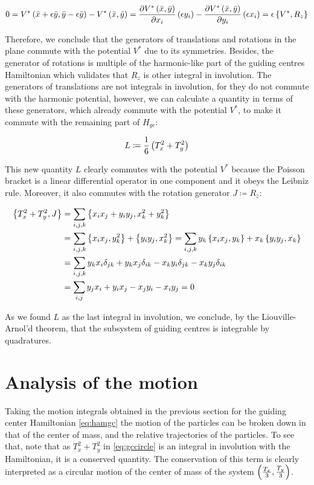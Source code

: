 \begin{equation*}
0={V^*\left( \bar{x} +\epsilon \bar{y}, \bar{y} - \epsilon \bar{y} \right)-V^*\left( \bar{x},\bar{y} \right)}
= \frac{\partial V^*\left( \bar{x},\bar{y} \right)}{\partial x_i} \left( \epsilon y_i \right) -                                \frac{\partial V^*\left( \bar{x},\bar{y} \right)}{\partial y_i} \left( \epsilon x_i \right)                                        = \epsilon \left\lbrace V^*, R_z \right\rbrace
\end{equation*}

Therefore, we conclude that the generators of translations and rotations in the plane commute with the potential $V^*$ due to its symmetries. Besides, the generator of rotations is multiple of the harmonic-like part of the guiding centres Hamiltonian which validates that $R_z$ is other integral in involution. The generators of translations are not integrals in involution, for they do not commute with the harmonic potential, however, we can calculate a quantity in terms of these generators, which already commute with the potential $V^*$, to make it commute with the remaining part of $H_{gc}$: 

\begin{equation}
L \coloneqq \frac{1}{6}\left( T_x^2 + T_y^2 \right)
\label{eq:gccircle}
\end{equation}

This new quantity $L$ clearly commutes with the potential $V^*$ because the Poisson bracket is  a linear differential operator in one component and it obeys the Leibniz rule. Moreover, it also commutes with the rotation generator $J \coloneqq R_z$:

\begin{align*}
\left\lbrace T_x^2+ T_y^2,  J \right\rbrace &= \sum_{i,j,k} \left\lbrace x_ix_j + y_iy_j, x_k^2 + y_k^2 \right\rbrace\\
&= \sum_{i,j,k}  \left\lbrace x_ix_j, y_k^2 \right\rbrace + \left\lbrace y_iy_j, x_k^2 \right\rbrace = \sum_{i,j,k} y_k \left\lbrace x_ix_j, y_k \right\rbrace + x_k \left\lbrace y_iy_j, x_k \right\rbrace\\
&= \sum_{i,j,k} y_kx_i\delta_{jk}+y_kx_j\delta_{ik} - x_ky_i\delta_{jk}- x_ky_j\delta_{ik}\\
&= \sum_{i,j} y_jx_i + y_ix_j - x_jy_i - x_iy_j = 0
\end{align*}

As we found $L$ as the last integral in involution, we conclude, by the Liouville-Arnol'd theorem, that the subsystem of guiding centres is integrable by quadratures.\\

\section{Analysis of the motion}
Taking the motion integrals obtained in the previous section for the guiding center Hamiltonian \eqref{eq:hamgc} the motion of the particles can be broken down in that of the center of mass, and the relative trajectories of the particles. To see that, note that as $T_x^2 + T_y^2$ in \eqref{eq:gccircle} is an integral in involution with the Hamiltonian, it is a conserved quantity. The conservation of this term is clearly interpreted as a circular motion of the center of mass of the system $\left( \frac{T_x}{3},\frac{T_y}{3} \right)$.\\

